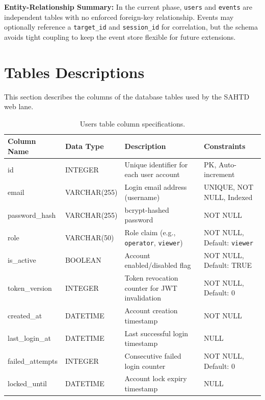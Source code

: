 \documentclass[12pt,a4paper]{report}
\begin{document}
\textbf{Entity-Relationship Summary:}
In the current phase, \texttt{users} and \texttt{events} are independent tables with no enforced foreign-key relationship. Events may optionally reference a \texttt{target\_id} and \texttt{session\_id} for correlation, but the schema avoids tight coupling to keep the event store flexible for future extensions.

\section{Tables Descriptions}
This section describes the columns of the database tables used by the SAHTD web lane.

\begingroup
\small
\setlength{\tabcolsep}{4pt}
\renewcommand{\arraystretch}{1.15}

\begin{table}[H]
\centering
\caption{Users table column specifications.}
\label{tab:users_table}
\begin{tabularx}{\textwidth}{@{}L{2.8cm} L{2.8cm} Y L{3.2cm}@{}}
\toprule
\textbf{Column Name} & \textbf{Data Type} & \textbf{Description} & \textbf{Constraints} \\
\midrule
id & INTEGER & Unique identifier for each user account & PK, Auto-increment \\
email & VARCHAR(255) & Login email address (username) & UNIQUE, NOT NULL, Indexed \\
password\_hash & VARCHAR(255) & bcrypt-hashed password & NOT NULL \\
role & VARCHAR(50) & Role claim (e.g., \texttt{operator}, \texttt{viewer}) & NOT NULL, Default: \texttt{viewer} \\
is\_active & BOOLEAN & Account enabled/disabled flag & NOT NULL, Default: TRUE \\
token\_version & INTEGER & Token revocation counter for JWT invalidation & NOT NULL, Default: 0 \\
created\_at & DATETIME & Account creation timestamp & NOT NULL \\
last\_login\_at & DATETIME & Last successful login timestamp & NULL \\
failed\_attempts & INTEGER & Consecutive failed login counter & NOT NULL, Default: 0 \\
locked\_until & DATETIME & Account lock expiry timestamp & NULL \\
\bottomrule
\end{tabularx}
\end{table}
\end{document}
